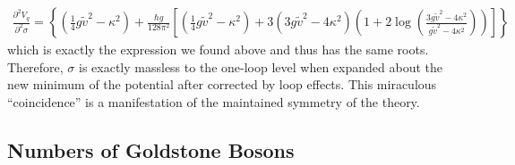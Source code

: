 \documentclass[12pt]{article}
\begin{document}
\begin{align*}
\frac{\partial^2 V_q}{\partial^2 \sigma} = \left\{ (\tfrac{1}{4} g \tilde{v}^2 - \kappa^2) + \frac{\hbar g}{128 \pi^2}  \left[ (\tfrac{1}{4} g \tilde{v}^2 - \kappa^2) + 3 (3 g \tilde{v}^2 - 4 \kappa^2) \left( 1 + 2 \log{\left( \frac{3 g \tilde{v}^2 - 4 \kappa^2}{g \tilde{v}^2 - 4 \kappa^2} \right)} \right) \right] \right\} 
\end{align*}  
which is exactly the expression we found above and thus has the same roots. Therefore, $\sigma$ is exactly massless to the one-loop level when expanded about the new minimum of the potential after corrected by loop effects. This miraculous ``coincidence'' is a manifestation of the maintained symmetry of the theory.

\subsection{Numbers of Goldstone Bosons}
\end{document}
